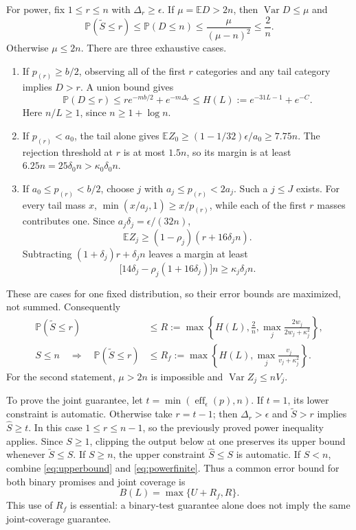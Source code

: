 \documentclass[10pt]{article}
\newcommand{\E}{\mathbb E}
\newcommand{\Prb}{\mathbb P}
\newcommand{\Var}{\operatorname{Var}}
\newcommand{\eff}{\operatorname{eff}}
\begin{document}
For power, fix $1\le r\le n$ with $\Delta_r\ge\epsilon$.
If $\mu=\E D>2n$, then $\Var D\le\mu$ and
\begin{equation}\label{eq:largeocc}
 \Prb(\widetilde S\le r)\le\Prb(D\le n)
 \le\frac\mu{(\mu-n)^2}\le\frac2n.
\end{equation}
Otherwise $\mu\le2n$. There are three exhaustive cases.
\begin{enumerate}
\item If $p_{(r)}\ge b/2$, observing all of the first $r$ categories and
any tail category implies $D>r$. A union bound gives
\begin{equation}\label{eq:heavy}
 \Prb(D\le r)\le r e^{-mb/2}+e^{-m\Delta_r}
 \le H(L):=e^{-31L-1}+e^{-C}.
\end{equation}
Here $n/L\ge1$, since $n\ge1+\log n$.
\item If $p_{(r)}<a_0$, the tail alone gives
$\E Z_0\ge(1-1/32)\epsilon/a_0\ge7.75n$.
The rejection threshold at $r$ is at most $1.5n$, so its margin is at least
$6.25n=25\delta_0n>\kappa_0\delta_0n$.
\item If $a_0\le p_{(r)}<b/2$, choose $j$ with
$a_j\le p_{(r)}<2a_j$. Such a $j\le J$ exists. For every tail mass $x$,
$\min(x/a_j,1)\ge x/p_{(r)}$, while each of the first $r$ masses
contributes one. Since $a_j\delta_j=\epsilon/(32n)$,
\[
 \E Z_j\ge(1-\rho_j)(r+16\delta_j n).
\]
Subtracting $(1+\delta_j)r+\delta_jn$ leaves a margin at least
\[
 \bigl[14\delta_j-\rho_j(1+16\delta_j)\bigr]n
 \ge\kappa_j\delta_jn.
\]
\end{enumerate}
These are cases for one fixed distribution, so their error bounds are
maximized, not summed. Consequently
\begin{align}
 \Prb(\widetilde S\le r)&\le R:=
 \max\left\{H(L),\frac2n,\max_j\frac{2w_j}{2w_j+\kappa_j^2}\right\},
 \label{eq:powergeneral}\\
 S\le n\quad\Longrightarrow\quad
 \Prb(\widetilde S\le r)&\le R_f:=
 \max\left\{H(L),\max_j\frac{v_j}{v_j+\kappa_j^2}\right\}.
 \label{eq:powerfinite}
\end{align}
For the second statement, $\mu>2n$ is impossible and
$\Var Z_j\le nV_j$.

To prove the joint guarantee, let $t=\min(\eff_\epsilon(p),n)$.
If $t=1$, its lower constraint is automatic. Otherwise take $r=t-1$;
then $\Delta_r>\epsilon$ and $\widetilde S>r$ implies $\widehat S\ge t$.
In this case $1\le r\le n-1$, so the previously proved power inequality
applies. Since $S\ge1$, clipping the output below at one preserves its
upper bound whenever $\widetilde S\le S$.
If $S\ge n$, the upper constraint $\widehat S\le S$ is automatic.
If $S<n$, combine \eqref{eq:upperbound} and \eqref{eq:powerfinite}.
Thus a common error bound for both binary promises and joint coverage is
\begin{equation}\label{eq:common}
 B(L)=\max\{U+R_f,R\}.
\end{equation}
This use of $R_f$ is essential: a binary-test guarantee alone does not imply
the same joint-coverage guarantee.
\end{document}

